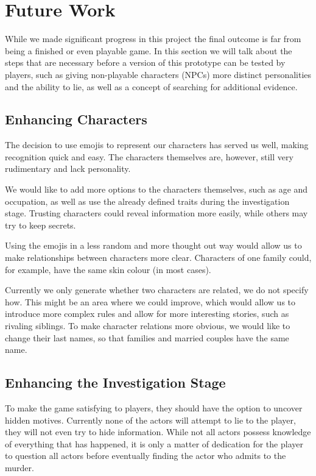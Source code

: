 \section{Future Work} \label{future_work}

While we made significant progress in this project the final outcome is far from being a finished or even playable game.
In this section we will talk about the steps that are necessary before a version of this prototype can be tested by players, such as giving non-playable characters (NPCs) more distinct personalities and the ability to lie, as well as a concept of searching for additional evidence.

\subsection{Enhancing Characters}

The decision to use emojis to represent our characters has served us well, making recognition quick and easy.
The characters themselves are, however, still very rudimentary and lack personality.

We would like to add more options to the characters themselves, such as age and occupation, as well as use the already defined traits during the investigation stage. Trusting characters could reveal information more easily, while others may try to keep secrets.

Using the emojis in a less random and more thought out way would allow us to make relationships between characters more clear. Characters of one family could, for example, have the same skin colour (in most cases).

Currently we only generate whether two characters are related, we do not specify how.
This might be an area where we could improve, which would allow us to introduce more complex rules and allow for more interesting stories, such as rivaling siblings. To make character relations more obvious, we would like to change their last names, so that families and married couples have the same name.

\subsection{Enhancing the Investigation Stage}
To make the game satisfying to players, they should have the option to uncover hidden motives.
Currently none of the actors will attempt to lie to the player, they will not even try to hide information.
While not all actors possess knowledge of everything that has happened, it is only a matter of dedication for the player to question all actors before eventually finding the actor who admits to the murder.

